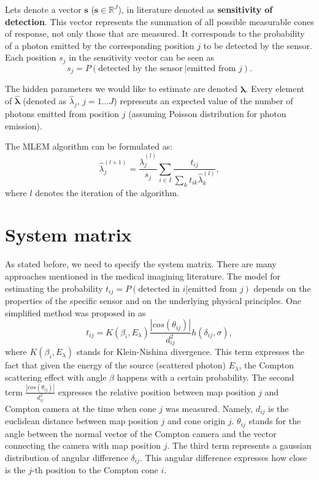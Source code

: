 Lets denote a vector $\mathbf{s}$ ($\mathbf{s} \in \mathbb{R}^{J}$), in literature denoted as \textbf{sensitivity of detection}.
This vector represents the summation of all possible measurable cones of response, not only those that are measured.
It corresponds to the probability of a photon emitted by the corresponding position $j$ to be detected by the sensor.
Each position $s_{j}$ in the sensitivity vector can be seen as 
\begin{equation}
  s_{j} =  P(\textrm{detected by the sensor}\ | \textrm{emitted from } j).
\end{equation}

The hidden parameters we would like to estimate are denoted $\bm{\hat{\lambda}}$.
Every element of $\bm{\hat{\lambda}}$ (denoted as $\hat{\lambda}_{j}$, $j = 1 \dotsc J$) represents an expected value of the number of photons emitted from position $j$ (assuming Poisson distribution for photon emission).

The \ac{MLEM} algorithm can be formulated as:
\begin{equation}
\hat{\lambda}_{j}^{(l+1)} = \frac{\hat{\lambda}_{j}^{(l)}}{s_{j}} \sum_{i \in I} \frac{t_{ij}}{\sum_{k} t_{ik} \hat{\lambda}_{k}^{(l)}},
  \label{eq:MLEM}
\end{equation}
where $l$ denotes the iteration of the algorithm.

\section{System matrix}
As stated before, we need to specify the system matrix.
There are many approaches mentioned in the medical imagining literature.
The model for estimating the probability $t_{ij} = P(\textrm{detected in } i | \textrm{emitted from } j)$ depends on the properties of the specific sensor and on the underlying physical principles.
One simplified method was proposed in \cite{maxim2016} as
\begin{equation}
  t_{ij} = K(\beta_{i},E_{\lambda})   \frac{\left| cos(\theta_{ij}) \right|}{d^{2}_{ij}} h(\delta_{ij}, \sigma),
\end{equation}
where $K(\beta_{i},E_{\lambda})$ stands for Klein-Nishina divergence. 
This term expresses the fact that given the energy of the source (scattered photon) $E_{\lambda}$, the Compton scattering effect with angle $\beta$ happens with a certain probability. 
The second term  $\frac{\left| cos(\theta_{ij}) \right|}{d^{2}_{ij}}$ expresses the relative position between map position $j$ and Compton camera at the time when cone $j$ was measured.
Namely, $d_{ij}$ is the euclidean distance between map position $j$ and cone origin $j$.
$\theta_{ij}$ stands for the angle between the normal vector of the Compton camera and the vector connecting the camera with map position $j$. 
The third term represents a gaussian distribution of angular difference $\delta_{ij}$. 
This angular difference expresses how close is the $j$-th position to the Compton cone $i$.

